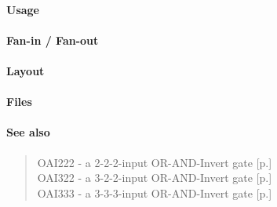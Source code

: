 \paragraph{Usage}

\paragraph{Fan-in / Fan-out}

\paragraph{Layout}

\paragraph{Files}

\paragraph{See also}
\begin{quote}
    OAI222 - a 2-2-2-input OR-AND-Invert gate [p.\pageref{OAI222}] \\
    OAI322 - a 3-2-2-input OR-AND-Invert gate [p.\pageref{OAI322}] \\
    OAI333 - a 3-3-3-input OR-AND-Invert gate [p.\pageref{OAI333}]
\end{quote}
